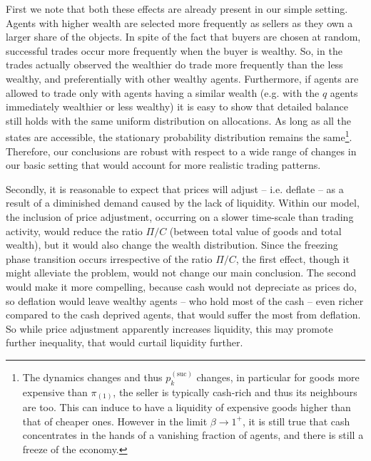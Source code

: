 First we note that both these effects are already present in our simple setting. Agents with higher wealth are selected more frequently as sellers as they own a larger share of the objects. In spite of the fact that buyers are chosen at random, successful trades occur more frequently when the buyer is wealthy. 
So, in the trades actually observed the wealthier do trade more frequently than the less wealthy, and preferentially with other wealthy agents. 
Furthermore, if agents are allowed to trade only with agents having a similar wealth (e.g. with the $q$ agents immediately wealthier or less wealthy) it is easy to show that detailed balance still holds with the same uniform distribution on allocations. As long as all the states are accessible, the stationary probability distribution remains the same\footnote{
The dynamics changes and thus $p_k^{(\text{suc})}$ changes, in particular for goods more expensive than $\pi_{(1)}$, the seller is typically cash-rich and thus its neighbours are too. This can induce to have a liquidity of expensive goods higher than that of cheaper ones. However in the limit $\beta \to 1^{+}$, it is still true that cash concentrates in the hands of a vanishing fraction of agents, and there is still a freeze of the economy.}. Therefore, our conclusions are robust with respect to a wide range of changes in our basic setting that would account for more realistic trading patterns. 

Secondly, it is reasonable to expect that prices will adjust -- i.e. deflate -- as a result of a diminished demand caused by the lack of liquidity. 
Within our model, the inclusion of price adjustment, occurring on a slower time-scale than trading activity, would reduce the ratio $\Pi/C$ (between total value of goods and total wealth), but it would also change the wealth distribution. 
Since the freezing phase transition occurs irrespective of the ratio $\Pi/C$, the first effect, though it might alleviate the problem, would not change our main conclusion. The second would make it more compelling, because cash would not depreciate as prices do, so deflation would leave 
wealthy 	%
agents -- who hold most of the cash -- even richer compared to the cash deprived agents, that would suffer the most from deflation. So while price adjustment apparently increases liquidity, this may promote further inequality, that would curtail liquidity further. 

